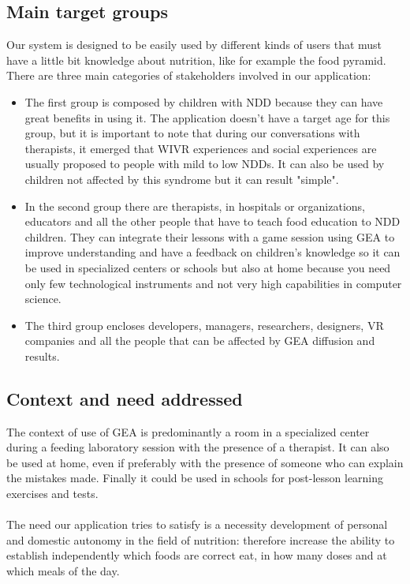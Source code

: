 \subsection{Main target groups}
Our system is designed to be easily used by different kinds of users that must have a little bit knowledge about nutrition, like for example the food pyramid. There are three main categories of stakeholders involved in our application:
\begin{itemize}
\item The first group is composed by children with NDD because they can have great benefits in using it. The application doesn't have a target age for this group, but it is important to note that during our conversations with therapists, it emerged that WIVR experiences and social experiences are usually proposed to people with mild to low NDDs. It can also be used by children not affected by this syndrome but it can result "simple".
\item In the second group there are therapists, in hospitals or organizations, educators and all the other people that have to teach food education to NDD children. They can integrate their lessons with a game session using GEA to improve understanding and have a feedback on children's knowledge so it can be used in specialized centers or schools but also at home because you need only few technological instruments and not very high capabilities in computer science.
\item The third group encloses developers, managers, researchers, designers, VR companies and all the people that can be affected by GEA diffusion and results.
\end{itemize} 
\subsection{Context and need addressed}
The context of use of GEA is predominantly a room in a specialized center during
a feeding laboratory session with the presence of a therapist. It can also be used at home, even if preferably with the presence of someone who can explain the mistakes made. Finally it could be used in schools for post-lesson learning exercises and tests.\\
\\
The need our application tries to satisfy is a necessity development of personal and domestic autonomy in the field of nutrition: therefore increase the ability to establish independently which foods are correct
eat, in how many doses and at which meals of the day.
